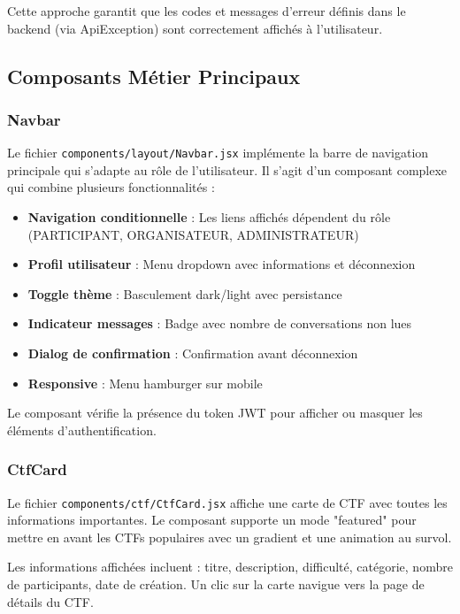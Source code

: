 Cette approche garantit que les codes et messages d'erreur définis dans le backend (via ApiException) sont correctement affichés à l'utilisateur.

\subsection{Composants Métier Principaux}

\subsubsection{Navbar}

Le fichier \texttt{components/layout/Navbar.jsx} implémente la barre de navigation principale qui s'adapte au rôle de l'utilisateur. Il s'agit d'un composant complexe qui combine plusieurs fonctionnalités :

\begin{itemize}
    \item \textbf{Navigation conditionnelle} : Les liens affichés dépendent du rôle (PARTICIPANT, ORGANISATEUR, ADMINISTRATEUR)
    \item \textbf{Profil utilisateur} : Menu dropdown avec informations et déconnexion
    \item \textbf{Toggle thème} : Basculement dark/light avec persistance
    \item \textbf{Indicateur messages} : Badge avec nombre de conversations non lues
    \item \textbf{Dialog de confirmation} : Confirmation avant déconnexion
    \item \textbf{Responsive} : Menu hamburger sur mobile
\end{itemize}

Le composant vérifie la présence du token JWT pour afficher ou masquer les éléments d'authentification.

\subsubsection{CtfCard}

Le fichier \texttt{components/ctf/CtfCard.jsx} affiche une carte de CTF avec toutes les informations importantes. Le composant supporte un mode "featured" pour mettre en avant les CTFs populaires avec un gradient et une animation au survol.

Les informations affichées incluent : titre, description, difficulté, catégorie, nombre de participants, date de création. Un clic sur la carte navigue vers la page de détails du CTF.

